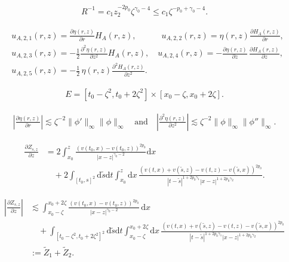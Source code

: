 \documentclass[10pt,a4paper]{amsart}
\newcommand {\deltah}{{\zeta}}
\renewcommand{\d}{\mathrm{d}}
\begin{document}
 \begin{align}\label{eq:R}
 R^{-1} %
     = c_1 z_2^{-2p_0}\deltah^{\gamma_0-4} \leq c_1 \deltah^{-p_0+\gamma_0-4}.
 \end{align}

 \begin{align} \nonumber
& u_{A,2,1}(r,z) =  \frac{\partial \eta(r,z)}{\partial r}H_A(r,z) , \qquad\quad u_{A,2,2}(r,z) = \eta(r, z)\frac{\partial H_A(r,z)}{\partial r} , \\  \nonumber
&u_{A,2,3}(r,z) = -\frac12 \frac{\partial^2\eta(r,z)}{\partial z^2}H_A(r,z), \quad
 u_{A,2,4}(r,z) = -\frac{\partial \eta(r,z)}{\partial z}\,  \frac{\partial H_A(r,z)}{\partial z}, \\
 &u_{A,2,5}(r,z) = -\frac12\, \eta(r,z)\frac{\partial^2H_A(r,z)}{\partial z^2}.
 \label{for8}
 \end{align}

\begin{align}\label{eq:E}
E=[t_0-\deltah^2, t_0+2\deltah^2]\times [x_0-\deltah, x_0+2\deltah].
\end{align}

 \begin{align}\label{eq:etabound}
           \left|\frac{\partial\eta(r,z)}{\partial r}\right| \lesssim \deltah^{-2}\|\phi'\|_{\infty}\|\phi\|_{\infty}\quad \text{and}\quad 
                      \left|\frac{\partial^2\eta(r,z)}{\partial z^2}\right| \lesssim \deltah^{-2} \|\phi\|_{\infty}\|\phi''\|_{\infty}.
           \end{align}

\begin{align}
             \frac{\partial Z_{s,z}}{\partial z}&=2\int_{x_0}^z \frac {(v(t_0,x)-v(t_0,z))^{2p_0}}{|x-z|^{\gamma_0-2} }\d x \nonumber\\
             &\quad +2 \int_{[t_0, s]^2}\d \tilde{s}\d t \int_{x_0}^z \d x\, \frac {(v(t,x)+v(\tilde{s},z)-v(t,z)-v(\tilde{s},x))^{2p_0}}{|t-\tilde{s}|^{1+2p_0\gamma_1}|x-z|^{1+2p_0\gamma_2}}. \label{eq:partialZ}
            \end{align}

\begin{align}
           \left| \frac{\partial Z_{s,z}}{\partial z} \right| &\lesssim \int_{x_0-\deltah}^{x_0+2\deltah} \frac {(v(t_0,x)-v(t_0,z))^{2p_0}}{|x-z|^{\gamma_0-2} }\, \d x\nonumber\\
           &\quad +
            \int_{[t_0-\deltah^2, t_0+2\deltah^2]^2}\d \tilde{s}\d t \int_{x_0-\deltah}^{x_0+2\deltah} \d x\, \frac {(v(t,x)+v(\tilde{s},z)-v(t,z)-v(\tilde{s},x))^{2p_0}}{|t-\tilde{s}|^{1+2p_0\gamma_1}|x-z|^{1+2p_0\gamma_2}}\nonumber\\
            &:=\tilde{Z}_1 +\tilde{Z}_2. 
 \label{z1z2}
\end{align}
\end{document}
